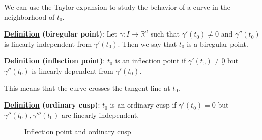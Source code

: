 \documentclass[10pt]{extarticle}
\newcommand{\R}{\mathbb{R}}
\begin{document}
We can use the Taylor expansion to study the behavior of a curve in the neighborhood of $t_0$.


\textbf{\underline{Definition} (biregular point)}:
Let $\gamma: I \to \R^d$ such that $\gamma'(t_0) \ne \underline 0$ and $\gamma''(t_0)$ is linearly independent from $\gamma'(t_0)$.
Then we say that $t_0$ is a biregular point.

\textbf{\underline{Definition} (inflection point)}:
$t_0$ is an inflection point if $\gamma'(t_0) \ne \underline 0$ but $\gamma''(t_0)$ is linearly dependent from $\gamma'(t_0)$.

This means that the curve crosses the tangent line at $t_0$.


\textbf{\underline{Definition} (ordinary cusp)}:
$t_0$ is an ordinary cusp if $\gamma'(t_0) = \underline 0$ but $\gamma''(t_0), \gamma'''(t_0)$ are linearly independent.

\begin{figure}
    \centering
    \caption{Inflection point and ordinary cusp}
    \label{fig:inflection_point_and_ordinary_cusp}
\end{figure}
\end{document}
